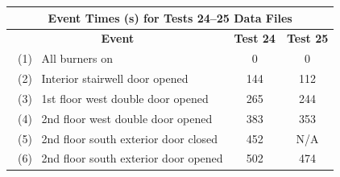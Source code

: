 \begin{figure}[!ht]
\renewcommand{\baselinestretch}{1}
\begin{minipage}[b]{0.88\columnwidth}
\begin{center}
	\begin{tabular}{lcc}
	\multicolumn{3}{c}{Event Times (s) for Tests 24--25 Data Files} \\
	\toprule
	\multicolumn{1}{c}{\textbf{Event}} 			& \textbf{Test 24}	& \textbf{Test 25} \\
	\midrule
	~(1)~ All burners on 						&   0		  		&	 0			\\
	~(2)~ Interior stairwell door opened 		&   144		  		&    112		\\
	~(3)~ 1st floor west double door opened 	&	265		  		&    244 	 	\\
	~(4)~ 2nd floor west double door opened 	&   383			  	&    353		\\
	~(5)~ 2nd floor south exterior door closed	&   452			  	&    N/A		\\
	~(6)~ 2nd floor south exterior door opened	&   502			  	&    474		\\

\end{tabular}
\end{center}
\end{minipage}
\end{figure}
